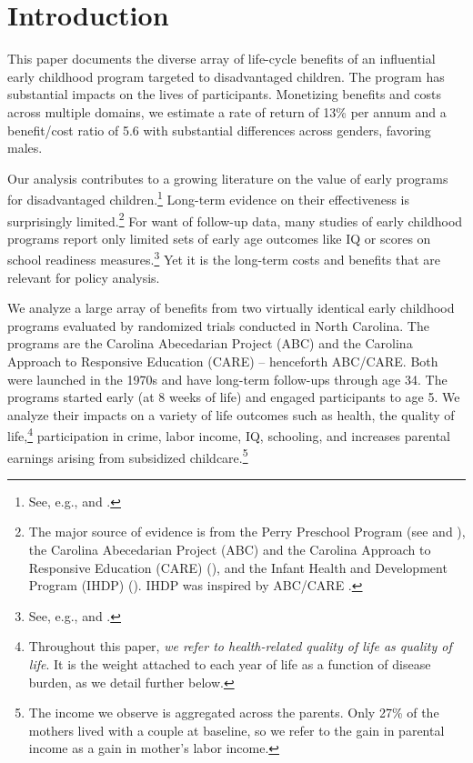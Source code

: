 \restoregeometry
\doublespacing

\setcounter{page}{0}

\section{Introduction}

This paper documents the diverse array of life-cycle benefits of an influential early childhood program targeted to disadvantaged children. The program has substantial impacts on the lives of participants. Monetizing benefits and costs across multiple domains, we estimate a rate of return of 13\% per annum and a benefit/cost ratio of 5.6 with substantial differences across genders, favoring males.

Our analysis contributes to a growing literature on the value of early programs for disadvantaged children.\footnote{See, e.g., \cite{Currie_2011_AER} and \cite{Elango_Hojman_etal_2016_Early-Edu}.} Long-term evidence on their effectiveness is surprisingly limited.\footnote{The major source of evidence is from the Perry Preschool Program (see \citealp{Schweinhart_Montie_ea_2005_BOOKlifetime} and \citealp{Heckman_Moon_etal_2010_RateofReturn,Heckman_Moon_etal_2010_QE}), the Carolina Abecedarian Project (ABC) and the Carolina Approach to Responsive Education (CARE) (\citealp{Ramey_Campbell_etal_2000_ADS,Ramey-etal_2012-ABC}), and the Infant Health and Development Program (IHDP) (\citealp{Gross_Spiker_etal_1997_BOOKHelpinglowbirth,Duncan_Sojourner_2013_JHR}). IHDP was inspired by ABC/CARE \citep[][]{Gross_Spiker_etal_1997_BOOKHelpinglowbirth}.} For want of follow-up data, many studies of early childhood programs report only limited sets of early age outcomes like IQ or scores on school readiness measures.\footnote{See, e.g., \cite{Kline_Walters_2016_QJE} and \cite{Weiland_2013_CD_Impacts-of-Pre-K}.} Yet it is the long-term costs and benefits that are relevant for policy analysis.

We analyze a large array of benefits from two virtually identical early childhood programs evaluated by randomized trials conducted in North Carolina. The programs are the Carolina Abecedarian Project (ABC) and the Carolina Approach to Responsive Education (CARE) -- henceforth ABC/CARE. Both were launched in the 1970s and have long-term follow-ups through age 34. The programs started early (at 8 weeks of life) and engaged participants to age 5. We analyze their impacts on a variety of life outcomes such as health, the quality of life,\footnote{Throughout this paper, \textit{we refer to health-related quality of life as quality of life}. It is the weight attached to each year of life as a function of disease burden, as we detail further below.} participation in crime, labor income, IQ, schooling, and increases parental earnings arising from subsidized childcare.\footnote{The income we observe is aggregated across the parents. Only 27\% of the mothers lived with a couple at baseline, so we refer to the gain in parental income as a gain in mother's labor income.}

